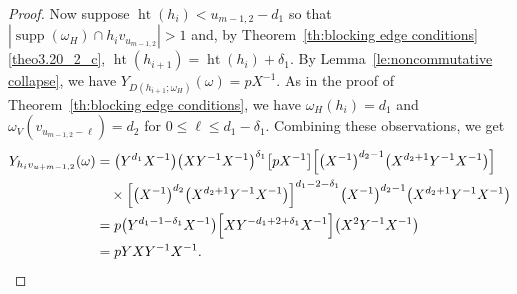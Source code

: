 \documentclass[ALCO,ThmDefs,Unicode,epreuves]{cedram}
\DeclareMathOperator{\hgt}{ht}
\DeclareMathOperator{\supp}{supp}
\begin{document}
\begin{proof}
 Now suppose $\hgt(h_i)<u_{m-1,2}-d_1$ so that $|\supp(\omega_H)\cap h_iv_{u_{m-1,2}}|>1$ and, by Theorem~\ref{th:blocking edge conditions}\ref{theo3.20_2_c}, $\hgt(h_{i+1})=\hgt(h_i)+\delta_1$.
 By Lemma~\ref{le:noncommutative collapse}, we have $Y_{D(h_{i+1};\omega_H)}(\omega)=pX^{-1}$.
 As in the proof of Theorem~\ref{th:blocking edge conditions}, we have $\omega_H(h_i)=d_1$ and $\omega_V(v_{u_{m-1,2}-\ell})=d_2$ for $0\le\ell\le d_1-\delta_1$.
 Combining these observations, we get
 \begin{align*}
 Y_{h_iv_{u+{m-1,2}}}(\omega) 
 &=\big(Y^{d_1}X^{-1}\big)\big(XY^{-1}X^{-1}\big)^{\delta_1}\big[pX^{-1}\big]\Big[\big(X^{-1}\big)^{d_2-1}\big(X^{d_2+1}Y^{-1}X^{-1}\big)\Big]\\
 &\quad\times\Big[\big(X^{-1}\big)^{d_2}\big(X^{d_2+1}Y^{-1}X^{-1}\big)\Big]^{d_1-2-\delta_1}\big(X^{-1}\big)^{d_2-1}\big(X^{d_2+1}Y^{-1}X^{-1}\big)\\
 &=p\big(Y^{d_1-1-\delta_1}X^{-1}\big)\Big[XY^{-d_1+2+\delta_1}X^{-1}\Big]\big(X^2Y^{-1}X^{-1}\big)\\
 &=pYXY^{-1}X^{-1}.\qedhere
 \end{align*}
\end{proof}
\end{document}
